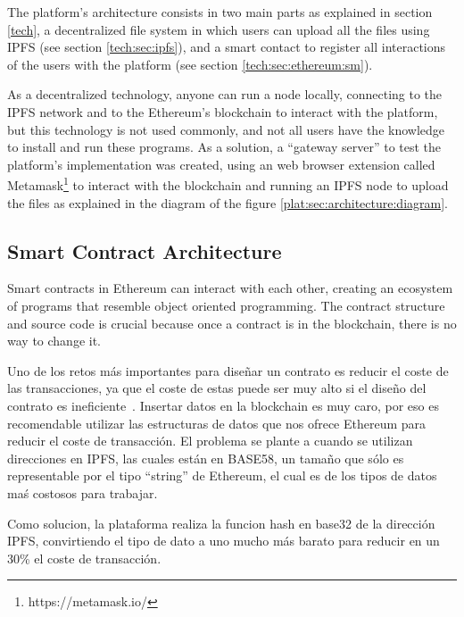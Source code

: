 The platform's architecture consists in two main parts as explained in section
\ref{tech}, a decentralized file system in which users can upload all the files
using IPFS (see section \ref{tech:sec:ipfs}), and a smart contact to register
all interactions of the users with the platform (see section
\ref{tech:sec:ethereum:sm}).

As a decentralized technology, anyone can run a node locally, connecting to the
IPFS network and to the Ethereum's blockchain to interact with the platform, but
this technology is not used commonly, and not all users have the knowledge to
install and run these programs. As a solution, a ``gateway server'' to test the
platform's implementation was created, using an web browser extension called
Metamask\footnote[1]{https://metamask.io/} to interact with the blockchain and
running an IPFS node to upload the files as explained in the diagram of the
figure \ref{plat:sec:architecture:diagram}.


\subsection{Smart Contract Architecture}

Smart contracts in Ethereum can interact with each other, creating an ecosystem
of programs that resemble object oriented programming. The contract structure
and source code is crucial because once a contract is in the blockchain, there
is no way to change it.

Uno de los retos más importantes para diseñar un contrato es reducir el coste de
las transacciones, ya que el coste de estas puede ser muy alto si el diseño del
contrato es ineficiente~\cite{croman2016scaling}. Insertar datos en la
blockchain es muy caro, por eso es recomendable utilizar las estructuras de
datos que nos ofrece Ethereum para reducir el coste de transacción. El problema
se plante a cuando se utilizan direcciones en IPFS, las cuales están en BASE58,
un tamaño que sólo es representable por el tipo ``string'' de Ethereum, el cual
es de los tipos de datos maś costosos para trabajar.

Como solucion, la plataforma realiza la funcion hash en base32 de la dirección
IPFS, convirtiendo el tipo de dato a uno mucho más barato para reducir en un
30\% el coste de transacción.

